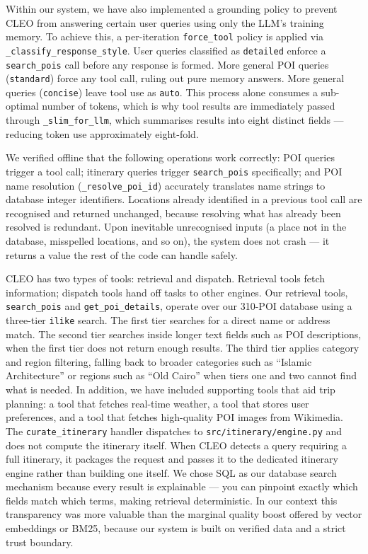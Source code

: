 Within our system, we have also implemented a grounding policy to prevent CLEO from
answering certain user queries using only the LLM's training memory. To achieve this, a
per-iteration \texttt{force\_tool} policy is applied via \texttt{\_classify\_response\_style}. User
queries classified as \texttt{detailed} enforce a \texttt{search\_pois} call before any response
is formed. More general POI queries (\texttt{standard}) force any tool call, ruling out pure
memory answers. More general queries (\texttt{concise}) leave tool use as \texttt{auto}. This
process alone consumes a sub-optimal number of tokens, which is why tool results are
immediately passed through \texttt{\_slim\_for\_llm}, which summarises results into eight
distinct fields — reducing token use approximately eight-fold.

We verified offline that the following operations work correctly: POI queries trigger a tool call;
itinerary queries trigger \texttt{search\_pois} specifically; and POI name resolution
(\texttt{\_resolve\_poi\_id}) accurately translates name strings to database integer identifiers.
Locations already identified in a previous tool call are recognised and returned unchanged,
because resolving what has already been resolved is redundant. Upon inevitable unrecognised
inputs (a place not in the database, misspelled locations, and so on), the system does not
crash — it returns a value the rest of the code can handle safely.

CLEO has two types of tools: retrieval and dispatch. Retrieval tools fetch information;
dispatch tools hand off tasks to other engines. Our retrieval tools, \texttt{search\_pois} and
\texttt{get\_poi\_details}, operate over our 310-POI database using a three-tier
\texttt{ilike} search. The first tier searches for a direct name or address match. The second tier
searches inside longer text fields such as POI descriptions, when the first tier does not return
enough results. The third tier applies category and region filtering, falling back to broader
categories such as ``Islamic Architecture'' or regions such as ``Old Cairo'' when tiers one and
two cannot find what is needed. In addition, we have included supporting tools that aid trip
planning: a tool that fetches real-time weather, a tool that stores user preferences, and a tool
that fetches high-quality POI images from Wikimedia. The \texttt{curate\_itinerary} handler
dispatches to \texttt{src/itinerary/engine.py} and does not compute the itinerary itself. When
CLEO detects a query requiring a full itinerary, it packages the request and passes it to the
dedicated itinerary engine rather than building one itself. We chose SQL as our database
search mechanism because every result is explainable — you can pinpoint exactly which fields
match which terms, making retrieval deterministic. In our context this transparency was more
valuable than the marginal quality boost offered by vector embeddings or BM25, because our
system is built on verified data and a strict trust boundary.


